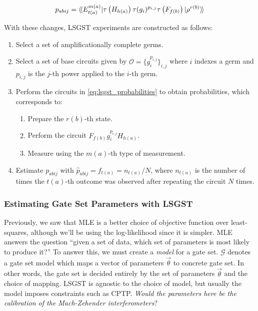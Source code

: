 \vspace{1em}

\begin{equation} \label{eq:lsgst_probabilities}
    p_{abij} = \langle\!\braket{E_{t(a)}^{m(a)} | \tau\left(H_{h(a)}\right) \tau(g_i)^{p_{i,j}} \tau\left(F_{f(b)}\right) | \rho^{r(b)}}\!\rangle
\end{equation}

\vspace{1em}

\noindent With these changes, \ac{LSGST} experiments are constructed as follows:
\begin{enumerate}
    \item Select a set of amplificationally complete germs.
    \item Select a set of base circuits given by $\mathcal{O} = \{g_i^{p_{i,j}}\}_{i,j}$ where $i$
    indexes a germ and $p_{i, j}$ is the $j$-th power applied to the $i$-th germ.
    \item Perform the circuits in \ref{eq:lsgst_probabilities} to obtain probabilities, which
    corresponds to:
    \begin{enumerate}
        \item Prepare the $r(b)$-th state.
        \item Perform the circuit $F_{f(b)} g_i^{p_{i, j}} H_{h(a)}$.
        \item Measure using the $m(a)$-th type of measurement.
    \end{enumerate}
    \item Estimate $p_{abij}$ with $\hat{p}_{abij} = f_{t(a)} = n_{t(a)} / N$, where $n_{t(a)}$ is
    the number of times the $t(a)$-th outcome was observed after repeating the circuit $N$ times.
\end{enumerate}

\subsubsection{Estimating Gate Set Parameters with LSGST}

Previously, we saw that MLE is a better choice of objective function over least-squares, although
we'll be using the log-likelihood since it is simpler. MLE answers the question ``given a set of
data, which set of parameters is most likely to produce it?'' To answer this, we must create a
\textit{model} for a gate set. $\mathcal{G}$ denotes a gate set model which maps a vector of
parameters $\vec{\theta}$ to concrete gate set. In other words, the gate set is decided entirely by
the set of parameters $\vec{\theta}$ and the choice of mapping. LSGST is agnostic to the choice of
model, but usually the model imposes constraints such as \ac{CPTP}. \textit{Would the parameters
here be the calibration of the Mach-Zehender interferometers}?

